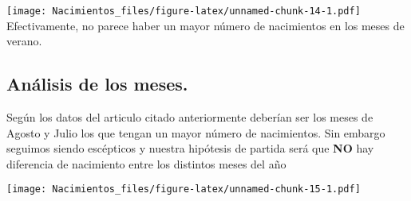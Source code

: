 \documentclass[
]{article}
\newenvironment{Shaded}{\begin{snugshade}}{\end{snugshade}}
\newcommand{\AttributeTok}[1]{\textcolor[rgb]{0.77,0.63,0.00}{#1}}
\newcommand{\ControlFlowTok}[1]{\textcolor[rgb]{0.13,0.29,0.53}{\textbf{#1}}}
\newcommand{\DecValTok}[1]{\textcolor[rgb]{0.00,0.00,0.81}{#1}}
\newcommand{\FunctionTok}[1]{\textcolor[rgb]{0.00,0.00,0.00}{#1}}
\newcommand{\NormalTok}[1]{#1}
\newcommand{\OtherTok}[1]{\textcolor[rgb]{0.56,0.35,0.01}{#1}}
\newcommand{\SpecialCharTok}[1]{\textcolor[rgb]{0.00,0.00,0.00}{#1}}
\newcommand{\StringTok}[1]{\textcolor[rgb]{0.31,0.60,0.02}{#1}}
\begin{document}
\begin{Shaded}
\end{Shaded}

\texttt{[image: Nacimientos\_files/figure-latex/unnamed-chunk-14-1.pdf]}
Efectivamente, no parece haber un mayor número de nacimientos en los
meses de verano.

\hypertarget{anuxe1lisis-de-los-meses.}{%
\subsection{Análisis de los meses.}\label{anuxe1lisis-de-los-meses.}}

Según los datos del articulo citado anteriormente deberían ser los meses
de Agosto y Julio los que tengan un mayor número de nacimientos. Sin
embargo seguimos siendo escépticos y nuestra hipótesis de partida será
que \textbf{NO} hay diferencia de nacimiento entre los distintos meses
del año

\begin{Shaded}
\end{Shaded}

\texttt{[image: Nacimientos\_files/figure-latex/unnamed-chunk-15-1.pdf]}
\end{document}
